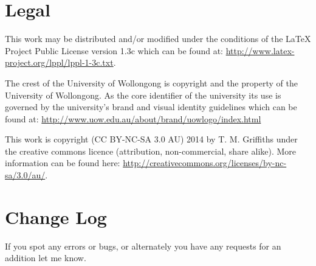 \documentclass[12pt,oneside]{article}
\begin{document}
\section{Legal}
This work may be distributed and/or modified under the conditions of the LaTeX Project Public License version 1.3c which can be found at: \url{http://www.latex-project.org/lppl/lppl-1-3c.txt}.

The crest of the University of Wollongong is copyright and the property of the University of Wollongong. As the core identifier of the university its use is governed by the university's brand and visual identity guidelines 
which can be found at: \url{http://www.uow.edu.au/about/brand/uowlogo/index.html}

This work is copyright (CC BY-NC-SA 3.0 AU) 2014 by T. M. Griffiths under the creative commons licence (attribution, non-commercial, share alike). More information can be found here: \url{http://creativecommons.org/licenses/by-nc-sa/3.0/au/}.

\section{Change Log}
If you spot any errors or bugs, or alternately you have any requests for an addition let me know.
\end{document}
